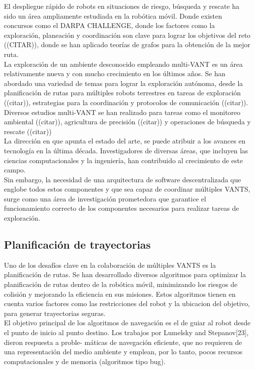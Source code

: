 \documentclass[sigconf]{acmart}
\begin{document}
El despliegue rápido de robots en situaciones de riesgo, búsqueda y rescate ha sido un área ampliamente estudiada en la robótica móvil. Donde existen concursos como el DARPA CHALLENGE, donde los factores como la exploración, planeación y coordinación son clave para lograr los objetivos del reto ((CITAR)), donde se han aplicado teorías de grafos para la obtención de la mejor ruta.\\

La exploración de un ambiente desconocido empleando multi-VANT es un área relativamente nueva y con mucho crecimiento en los últimos años. Se han abordado una variedad de temas para lograr la exploración autónoma, desde la planificación de rutas para múltiples robots terrestres en tareas de exploración ((citar)), estrategias para la coordinación y protocolos de comunicación ((citar)). Diversos estudios multi-VANT se han realizado para tareas como el monitoreo ambiental ((citar)), agricultura de precisión ((citar)) y operaciones de búsqueda y rescate ((citar))\\

La dirección en que apunta el estado del arte, se puede atribuir a los avances en tecnología en la última década. Investigadores de diversas áreas, que incluyen las ciencias computacionales y la ingeniería, han contribuido al crecimiento de este campo.\\

Sin embargo, la necesidad de una arquitectura de software descentralizada que englobe todos estos componentes y que sea capaz de coordinar múltiples VANTS, surge como una área de investigación prometedora que garantice el funcionamiento correcto de los componentes necesarios para realizar tareas de exploración.

\subsection*{Planificación de trayectorias}

Uno de los desafíos clave en la colaboración de múltiples VANTS es la planificación de rutas. Se han desarrollado diversos algoritmos para optimizar la planificación de rutas dentro de la robótica móvil, minimizando los riesgos de colisión y mejorando la eficiencia en sus misiones. Estos algoritmos tienen en cuenta varios factores como las restricciones del robot y la ubicacion del objetivo, para generar trayectorias seguras.\\

El objetivo principal de los algoritmos de navegación es el de guiar al robot desde el punto de inicio al punto destino. Los trabajos por Lumelsky and Stepanov[23], dieron respuesta a proble- máticas de navegación eficiente, que no requieren de una representación del medio ambiente y emplean, por lo tanto, pocos recursos computacionales y de memoria (algoritmos tipo bug).\\
\end{document}
